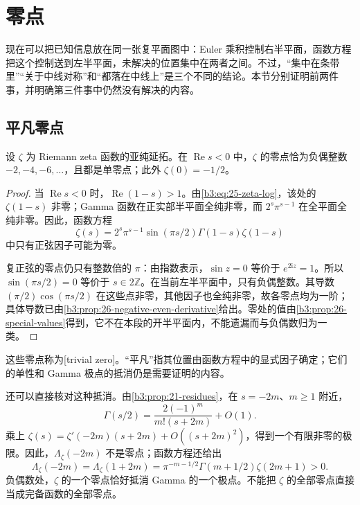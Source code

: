 \section{零点}
\label{b3:sec:2605}

现在可以把已知信息放在同一张复平面图中：Euler 乘积控制右半平面，函数方程把这个控制送到左半平面，未解决的位置集中在两者之间。不过，“集中在条带里”“关于中线对称”和“都落在中线上”是三个不同的结论。本节分别证明前两件事，并明确第三件事中仍然没有解决的内容。

\subsection{平凡零点}
\label{b3:subsec:260501}

\begin{proposition}[左半平面的零点]\label{b3:prop:26-trivial-zeros}
设 \(\zeta\) 为 Riemann zeta 函数的亚纯延拓。在 \(\operatorname{Re}s<0\) 中，\(\zeta\) 的零点恰为负偶整数 \(-2,-4,-6,\ldots\)，且都是单零点；此外 \(\zeta(0)=-1/2\)。
\end{proposition}
\begin{proof}
当 \(\operatorname{Re}s<0\) 时，\(\operatorname{Re}(1-s)>1\)。由\eqref{b3:eq:25-zeta-log}，该处的 \(\zeta(1-s)\) 非零；Gamma 函数在正实部半平面全纯非零，而 \(2^s\pi^{s-1}\) 在全平面全纯非零。因此，函数方程
\[
 \zeta(s)=2^s\pi^{s-1}\sin(\pi s/2)\Gamma(1-s)\zeta(1-s)
\]
中只有正弦因子可能为零。

复正弦的零点仍只有整数倍的 \(\pi\)：由指数表示，\(\sin z=0\) 等价于 \(e^{2\mathrm iz}=1\)。所以 \(\sin(\pi s/2)=0\) 等价于 \(s\in2\mathbb Z\)。在当前左半平面中，只有负偶整数。其导数 \((\pi/2)\cos(\pi s/2)\) 在这些点非零，其他因子也全纯非零，故各零点均为一阶；具体导数已由\cref{b3:prop:26-negative-even-derivative}给出。零处的值由\cref{b3:prop:26-special-values}得到，它不在本段的开半平面内，不能遗漏而与负偶数归为一类。
\end{proof}

这些零点称为[trivial zero]。“平凡”指其位置由函数方程中的显式因子确定；它们的单性和 Gamma 极点的抵消仍是需要证明的内容。

还可以直接核对这种抵消。由\cref{b3:prop:21-residues}，在 \(s=-2m\)、\(m\ge1\) 附近，
\[
 \Gamma(s/2)=\frac{2(-1)^m}{m!(s+2m)}+O(1).
\]
乘上 \(\zeta(s)=\zeta'(-2m)(s+2m)+O((s+2m)^2)\)，得到一个有限非零的极限。因此，\(\Lambda_\zeta(-2m)\) 不是零点；函数方程还给出
\[
 \Lambda_\zeta(-2m)=\Lambda_\zeta(1+2m)
 =\pi^{-m-1/2}\Gamma(m+1/2)\zeta(2m+1)>0.
\]
负偶数处，\(\zeta\) 的一个零点恰好抵消 Gamma 的一个极点。不能把 \(\zeta\) 的全部零点直接当成完备函数的全部零点。

